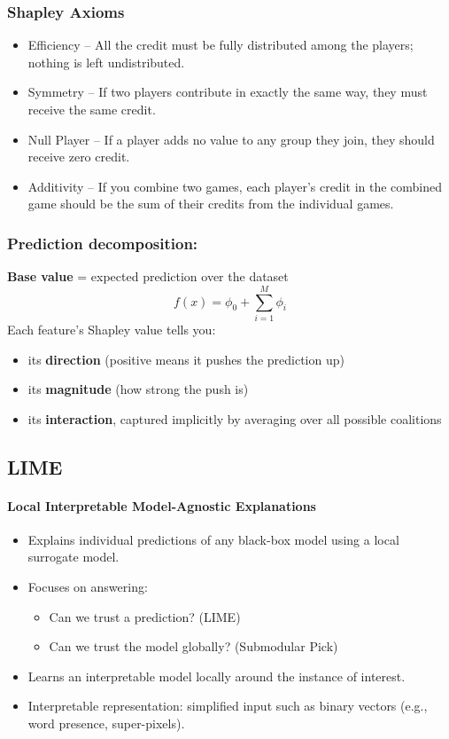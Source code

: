 \documentclass[10pt,a4paper]{article}
\begin{document}
	
		\subsubsection{Shapley Axioms}
		\begin{itemize}
			\item Efficiency – All the credit must be fully distributed among the players; nothing is left undistributed.
			\item Symmetry – If two players contribute in exactly the same way, they must receive the same credit.
			\item Null Player – If a player adds no value to any group they join, they should receive zero credit.
			\item Additivity – If you combine two games, each player’s credit in the combined game should be the sum of their credits from the individual games.
		\end{itemize}
	
		\subsubsection{Prediction decomposition:}
		\textbf{Base value} = expected prediction over the dataset
		$$	f(x) = \phi_0 + \sum_{i=1}^{M} \phi_i
		$$
		Each feature’s Shapley value tells you:
	
		\begin{itemize}
			\item its \textbf{direction} (positive means it pushes the prediction up)
			\item its \textbf{magnitude} (how strong the push is)
			\item its \textbf{interaction}, captured implicitly by averaging over all possible coalitions
		\end{itemize}
	
		
		\subsection{LIME}
		
		\paragraph{Local Interpretable Model-Agnostic Explanations}
		
		\begin{itemize}
		    \item Explains individual predictions of any black-box model using a local surrogate model.
		    \item Focuses on answering:
		    \begin{itemize}
		        \item Can we trust a prediction? (LIME)
		        \item Can we trust the model globally? (Submodular Pick)
		    \end{itemize}
		    \item Learns an interpretable model locally around the instance of interest.
		    \item Interpretable representation: simplified input such as binary vectors (e.g., word presence, super-pixels).
		\end{itemize}
		
\end{document}
